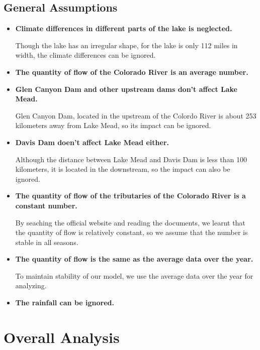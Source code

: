 \documentclass[12pt]{article}
\theoremstyle{definition}
\theoremstyle{remark}
\numberwithin{equation}{section}
\begin{document}
	\subsection{General Assumptions}
		\begin{itemize}
			\item \textbf{Climate differences in different parts of the lake is neglected.}
			
			Though the lake has an irregular shape, for the lake is only 112 miles in width, the climate differences can be ignored. \cite{Lake Mead}

			\item \textbf{The quantity of flow of the Colorado River is an average number.} \cite{Colorado River}

			\item \textbf{Glen Canyon Dam and other upstream dams don't affect Lake Mead.}
			
			Glen Canyon Dam, located in the upstream of the Colordo River is about 253 kilometers away from Lake Mead, so its impact can be ignored. \cite{List of Dams} \cite{Glen Canyon Dam}

			\item \textbf{Davis Dam doen't affect Lake Mead either. }
			
			Although the distance between Lake Mead and Davis Dam is less than 100 kilometers, it is located in the downstream, so the impact can
			also be ignored. \cite{List of Dams} \cite{Davis Dam}

			\item \textbf{The quantity of flow of the tributaries of the Colorado River is a constant number.}
			
			By seaching the official website and reading the documents, we learnt that the quantity of flow is relatively constant, so we assume that the number is stable in all seasons. \cite{Colorado River} \cite{Muddy River} \cite{Virgin River}

			\item \textbf{The quantity of flow is the same as the average data over the year.}
			
			To maintain stability of our model, we use the average data over the year for analyzing. 

			\item \textbf{The rainfall can be ignored.}
		\end{itemize}

\newpage
\section{Overall Analysis}
\end{document}

